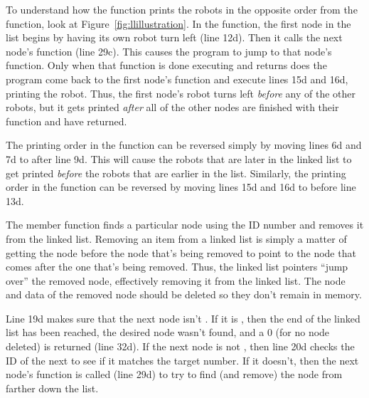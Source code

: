 To understand how the  function prints the robots in the opposite order from the  function, look at Figure~\ref{fig:llillustration}.  In the  function, the first node in the list begins by having its own robot turn left (line 12d).  Then it calls the next node's  function (line 29c).  This causes the program to jump to that node's  function.  Only when that function is done executing and returns does the program come back to the first node's  function and execute lines 15d and 16d, printing the robot.  Thus, the first node's robot turns left \emph{before} any of the other robots, but it gets printed \emph{after} all of the other nodes are finished with their  function and have returned.

The printing order in the  function can be reversed simply by moving lines 6d and 7d to after line 9d.  This will cause the robots that are later in the linked list to get printed \emph{before} the robots that are earlier in the list.  Similarly, the printing order in the  function can be reversed by moving lines 15d and 16d to before line 13d.



The  member function finds a particular node using the ID number and removes it from the linked list.  Removing an item from a linked list is simply a matter of getting the node before the node that's being removed to point to the node that comes after the one that's being removed.  Thus, the linked list pointers ``jump over'' the removed node, effectively removing it from the linked list.  The node and data of the removed node should be deleted so they don't remain in memory.

Line 19d makes sure that the next node isn't .  If it is , then the end of the linked list has been reached, the desired node wasn't found, and a 0 (for no node deleted) is returned (line 32d).
If the next node is not , then line 20d checks the ID of the next  to see if it matches the target number.  If it doesn't, then the next node's  function is called (line 29d) to try to find (and remove) the node from farther down the list.    

